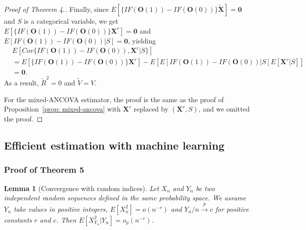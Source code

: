 \documentclass[12pt]{article}
\newtheorem{lemma}{Lemma}
\newtheorem{assumption}{Assumption}
\newcommand{\bX}{\boldsymbol{X}}
\newcommand{\bO}{\boldsymbol{O}}
\newcommand{\bzero}{\boldsymbol{0}}
\begin{document}
\begin{proof}[Proof of Theorem 4.]
Finally, since $E[\{IF(\bO(1)) - IF(\bO(0))\}\widetilde{\bX}] =\bzero$ and $S$ is a categorical variable, we get $E[\{IF(\bO(1)) - IF(\bO(0))\}\bX^r] = \bzero$ and $E[IF(\bO(1)) - IF(\bO(0))|S] = \bzero$, yielding 
\begin{align*}
    & E[Cov\{IF(\bO(1)) - IF(\bO(0)), \bX^r|S\}]\\
    &= E[\{IF(\bO(1)) - IF(\bO(0))\}\bX^r] - E[E[IF(\bO(1)) - IF(\bO(0))|S]E[\bX^r|S]] \\
    &= \bzero.
\end{align*}
As a result, $\widetilde{R}^2 = 0$ and $\widetilde{V} = V$.

For the mixed-ANCOVA estimator, the proof is the same as the proof of Proposition~\ref{prop: mixed-ancova} with $\bX^r$ replaced by $(\bX^r, S)$, and we omitted the proof.
\end{proof}

\subsection{Efficient estimation with machine learning}
\subsubsection{Proof of Theorem 5}

\begin{lemma}[Convergence with random indices]\label{lemma: random indices}
Let $X_n$ and $Y_n$ be two independent random sequences defined in the same probability space. We assume $Y_n$ take values in positive integers, $E[X_n^2] = o(n^{-r})$ and $Y_n/n \xrightarrow{p} c$ for positive constants $r$ and $c$. Then $E[X_{Y_n}^2|Y_n] = o_p(n^{-r})$.
\end{lemma}
\end{document}
